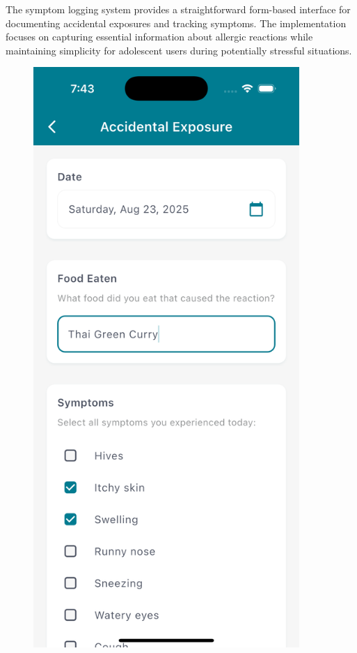 \documentclass[MScCS]{uccthesis}
\begin{document}
The symptom logging system provides a straightforward form-based interface for documenting accidental exposures and tracking symptoms. The implementation focuses on capturing essential information about allergic reactions while maintaining simplicity for adolescent users during potentially stressful situations.



\begin{figure}[htbp]
    \centering
    \begin{minipage}[b]{0.3\textwidth}
        \centering
        \includegraphics[width=0.9\textwidth,height=0.4\textheight,keepaspectratio]{Figures/symptom_log_1.png}

\end{minipage}
\end{figure}
\end{document}
